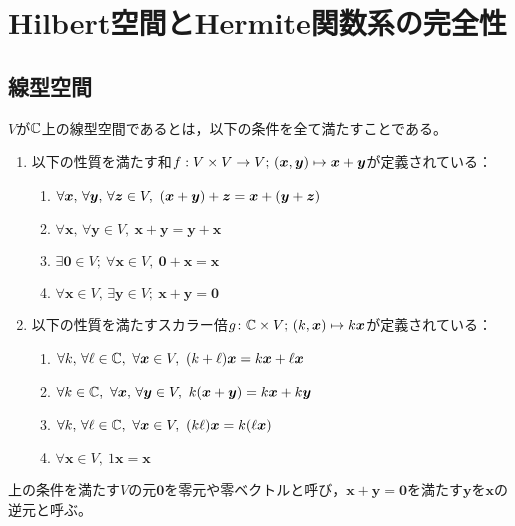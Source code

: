\documentclass[a4paper,draft]{ltjsarticle}
\begin{document}
\section{Hilbert空間とHermite関数系の完全性}\label{sec:Hilbert}

\subsection{線型空間}
\begin{defi}[線型空間]
    $V$が$\mathbb{C}$上の線型空間であるとは，以下の条件を全て満たすことである。
    \begin{enumerate}[label=(\arabic*)]
        \item 以下の性質を満たす和$f:V\times V\to V;\, \pare{\bm{x},\bm{y}}\mapsto \bm{x}+\bm{y}$が定義されている：
        \begin{enumerate}[label = (\roman*)]
            \item $\forall \bm{x},\, \forall \bm{y},\, \forall \bm{z} \in V, \
            \pare{\bm{x} + \bm{y}} + \bm{z} = \bm{x} + \pare{\bm{y} + \bm{z}}$
            \item $\forall \bm{x},\, \forall \bm{y} \in V, \ \bm{x} + \bm{y} = \bm{y} + \bm{x}$
            \item $\exists \bm{0} \in V;\ \forall \bm{x} \in V, \ \bm{0} + \bm{x} = \bm{x}$
            \item $\forall \bm{x}\in V,\, \exists \bm{y}\in V;\ \bm{x}+\bm{y}=\bm{0}$
        \end{enumerate}

        \item 以下の性質を満たすスカラー倍$g\colon \CC \times V;\, \pare{k, \bm{x}} \mapsto k\bm{x}$が定義されている：
        \begin{enumerate}[resume,label = (\roman*)]
            \item $\forall k,\, \forall \ell \in \CC, \ \forall \bm{x} \in V, \ \pare{k + \ell} \bm{x} = k\bm{x} + \ell\bm{x}$
            \item $\forall k \in \CC, \ \forall \bm{x},\, \forall \bm{y}\in V, \ k\pare{\bm{x} + \bm{y}} = k\bm{x} + k\bm{y}$
            \item $\forall k,\, \forall \ell\in\CC, \ \forall \bm{x}\in V, \ \pare{k\ell}\bm{x} = k\pare{\ell\bm{x}}$
            \item $\forall \bm{x} \in V, \ 1\bm{x} = \bm{x}$
        \end{enumerate}
    \end{enumerate}

    上の条件を満たす$V$の元$\bm{0}$を零元や零ベクトルと呼び，$\bm{x}+\bm{y}=\bm{0}$を満たす$\bm{y}$を$\bm{x}$の逆元と呼ぶ。
\end{defi}
\end{document}
